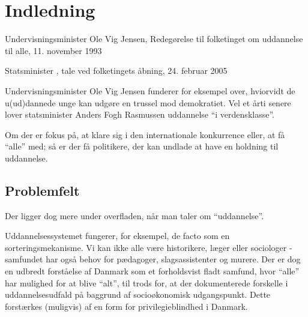 \section{Indledning}
\label{sec:intro}
\begin{epigraphs}
{Undervisningsminister Ole Vig Jensen, Redegørelse til folketinget om uddannelse til alle, 11. november 1993}

{Statsminister , tale ved folketingets åbning, 24. februar 2005}
\end{epigraphs}



Undervisningsminister Ole Vig Jensen funderer for eksempel over, hviorvidt de u(ud)dannede unge kan udgøre en trussel mod demokratiet.
 Vel et årti senere lover statsminister Anders Fogh Rasmussen uddannelse “i verdensklasse”.

 Om der er fokus på, at klare sig i den internationale konkurrence eller, at få “alle” med; så er der få politikere, der kan undlade at have en holdning til uddannelse.

\subsection{Problemfelt}
\label{sec:problem}
Der ligger dog mere under overfladen, når man taler om “uddannelse”.

Uddannelsessystemet fungerer, for eksempel, de facto som en sorteringsmekanisme.
Vi kan ikke alle være historikere, læger eller sociologer - samfundet har også behov for pædagoger, slagsassistenter og murere.
Der er dog en udbredt forståelse af Danmark som et forholdsvist fladt samfund, hvor “alle” har mulighed for at blive “alt”, til trods for, at der dokumenterede forskelle i uddannelsesudfald på baggrund af socioøkonomisk udgangspunkt.
Dette forstærkes (muligvis) af en form for privilegieblindhed i Danmark.  

